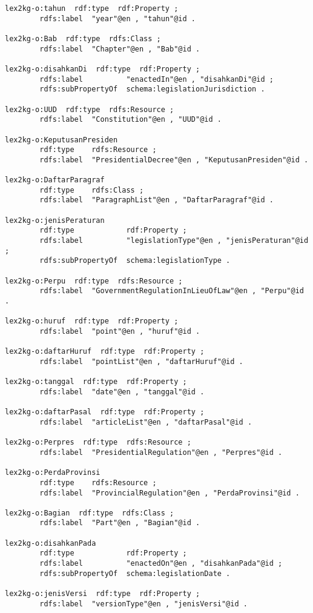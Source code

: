 \begin{lstlisting}
lex2kg-o:tahun  rdf:type  rdf:Property ;
        rdfs:label  "year"@en , "tahun"@id .

lex2kg-o:Bab  rdf:type  rdfs:Class ;
        rdfs:label  "Chapter"@en , "Bab"@id .

lex2kg-o:disahkanDi  rdf:type  rdf:Property ;
        rdfs:label          "enactedIn"@en , "disahkanDi"@id ;
        rdfs:subPropertyOf  schema:legislationJurisdiction .

lex2kg-o:UUD  rdf:type  rdfs:Resource ;
        rdfs:label  "Constitution"@en , "UUD"@id .

lex2kg-o:KeputusanPresiden
        rdf:type    rdfs:Resource ;
        rdfs:label  "PresidentialDecree"@en , "KeputusanPresiden"@id .

lex2kg-o:DaftarParagraf
        rdf:type    rdfs:Class ;
        rdfs:label  "ParagraphList"@en , "DaftarParagraf"@id .

lex2kg-o:jenisPeraturan
        rdf:type            rdf:Property ;
        rdfs:label          "legislationType"@en , "jenisPeraturan"@id ;
        rdfs:subPropertyOf  schema:legislationType .

lex2kg-o:Perpu  rdf:type  rdfs:Resource ;
        rdfs:label  "GovernmentRegulationInLieuOfLaw"@en , "Perpu"@id .

lex2kg-o:huruf  rdf:type  rdf:Property ;
        rdfs:label  "point"@en , "huruf"@id .

lex2kg-o:daftarHuruf  rdf:type  rdf:Property ;
        rdfs:label  "pointList"@en , "daftarHuruf"@id .

lex2kg-o:tanggal  rdf:type  rdf:Property ;
        rdfs:label  "date"@en , "tanggal"@id .

lex2kg-o:daftarPasal  rdf:type  rdf:Property ;
        rdfs:label  "articleList"@en , "daftarPasal"@id .

lex2kg-o:Perpres  rdf:type  rdfs:Resource ;
        rdfs:label  "PresidentialRegulation"@en , "Perpres"@id .

lex2kg-o:PerdaProvinsi
        rdf:type    rdfs:Resource ;
        rdfs:label  "ProvincialRegulation"@en , "PerdaProvinsi"@id .

lex2kg-o:Bagian  rdf:type  rdfs:Class ;
        rdfs:label  "Part"@en , "Bagian"@id .

lex2kg-o:disahkanPada
        rdf:type            rdf:Property ;
        rdfs:label          "enactedOn"@en , "disahkanPada"@id ;
        rdfs:subPropertyOf  schema:legislationDate .

lex2kg-o:jenisVersi  rdf:type  rdf:Property ;
        rdfs:label  "versionType"@en , "jenisVersi"@id .


\end{lstlisting}

